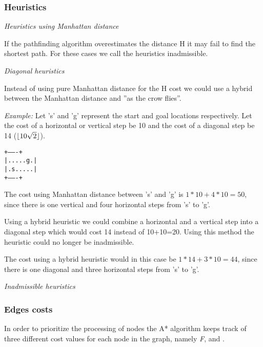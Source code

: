 \documentclass[12pt, a4paper]{article}
\DeclarePairedDelimiter{\floor}{\lfloor}{\rfloor}
\begin{document}


\subsubsection{Heuristics}
\label{Heuristics}

\textit{Heuristics using Manhattan distance}

If the pathfinding algorithm overestimates the distance H it may fail to find
the shortest path. For these cases we call the heuristics inadmissible.
\cite{astar2}

\textit{Diagonal heuristics}

Instead of using pure Manhattan distance for the H cost we could use a hybrid
between the Manhattan distance and ''as the crow flies''.

\textit{Example:} Let 's' and 'g' represent the start and goal locations
respectively. Let the cost of a horizontal or vertical step be 10 and the cost
of a diagonal step be 14 ($ \floor{10 \sqrt{2}} $).

\texttt{+-------+ \\
|.....g.| \\
|.s.....| \\
+-------+}

The cost using Manhattan distance between 's' and 'g' is $ 1*10 + 4*10 = 50 $,
since there is one vertical and four horizontal steps from 's' to 'g'.

Using a hybrid heuristic we could combine a horizontal and a vertical step into
a diagonal step which would cost 14 instead of 10+10=20. Using this method the
heuristic could no longer be inadmissible.

The cost using a hybrid heuristic would in this case be $ 1*14 + 3*10 = 44 $,
since there is one diagonal and three horizontal steps from 's' to 'g'.

\textit{Inadmissible heuristics}


\subsubsection{Edges costs}

In order to prioritize the processing of nodes the A* algorithm keeps track of
three different cost values for each node in the graph, namely \textit{F},
 and .
\end{document}
